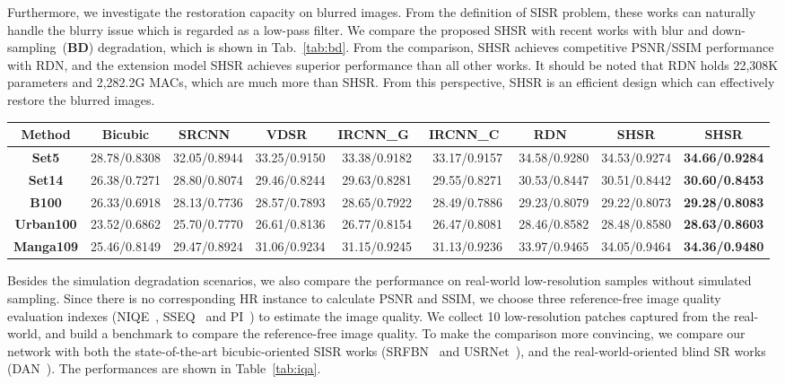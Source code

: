 \documentclass[manuscript,screen]{acmart}
\begin{document}
Furthermore, we investigate the restoration capacity on blurred images. From the definition of SISR problem, these works can naturally handle the blurry issue which is regarded as a low-pass filter. We compare the proposed SHSR with recent works with blur and  down-sampling~(\textbf{BD}) degradation, which is shown in Tab.~\ref{tab:bd}. From the comparison, SHSR achieves competitive PSNR/SSIM performance with RDN, and the extension model SHSR achieves superior performance than all other works. It should be noted that RDN holds 22,308K parameters and 2,282.2G MACs, which are much more than SHSR. From this perspective, SHSR is an efficient design which can effectively restore the blurred images.

\begin{table*}[t]
	\centering
	\caption{PSNR/SSIM results with \textbf{BD} degradation.}
	\label{tab:bd}
	\fontsize{6.5}{8}\selectfont
	\begin{tabular}{|c|c|c|c|c|c|c|c|c|}
		\hline
		\textbf{Method}& Bicubic& SRCNN~\cite{srcnn_pami2016}& VDSR~\cite{vdsr_cvpr2016}& IRCNN\_G~\cite{ircnn_cvpr2017}& IRCNN\_C~\cite{ircnn_cvpr2017}& RDN~\cite{rdn_pami2020}& SHSR& SHSR\\
		\hline
		\hline
		\textbf{Set5}& 			28.78/0.8308& 32.05/0.8944& 33.25/0.9150& 33.38/0.9182& 33.17/0.9157& 34.58/0.9280& 34.53/0.9274& \textbf{34.66/0.9284}\\
		\textbf{Set14}& 		26.38/0.7271& 28.80/0.8074& 29.46/0.8244& 29.63/0.8281& 29.55/0.8271& 30.53/0.8447& 30.51/0.8442& \textbf{30.60/0.8453}\\
		\textbf{B100}& 			26.33/0.6918& 28.13/0.7736& 28.57/0.7893& 28.65/0.7922& 28.49/0.7886& 29.23/0.8079& 29.22/0.8073& \textbf{29.28/0.8083}\\
		\textbf{Urban100}& 		23.52/0.6862& 25.70/0.7770& 26.61/0.8136& 26.77/0.8154& 26.47/0.8081& 28.46/0.8582& 28.48/0.8580& \textbf{28.63/0.8603}\\
		\textbf{Manga109}& 		25.46/0.8149& 29.47/0.8924& 31.06/0.9234& 31.15/0.9245& 31.13/0.9236& 33.97/0.9465& 34.05/0.9464& \textbf{34.36/0.9480}\\
		\hline
	\end{tabular}
\end{table*}


Besides the simulation degradation scenarios, we also compare the performance on real-world low-resolution samples without simulated sampling. Since there is no corresponding HR instance to calculate PSNR and SSIM, we choose three reference-free image quality evaluation indexes (NIQE~\cite{niqe_spl2013}, SSEQ~\cite{sseq_spic2014} and PI~\cite{esrgan_eccvw2018}) to estimate the image quality. We collect 10 low-resolution patches captured from the real-world, and build a benchmark to compare the reference-free image quality. To make the comparison more convincing, we compare our network with both the state-of-the-art bicubic-oriented SISR works (SRFBN~\cite{srfbn_cvpr2019} and USRNet~\cite{usrnet_cvpr2020}), and the real-world-oriented blind SR works (DAN~\cite{dan_nips2020}). The performances are shown in Table~\ref{tab:iqa}.
\end{document}
